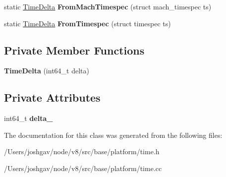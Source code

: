 \begin{DoxyCompactItemize}
\item 
static \hyperlink{classv8_1_1base_1_1_time_delta}{Time\+Delta} {\bfseries From\+Mach\+Timespec} (struct mach\+\_\+timespec ts)\hypertarget{classv8_1_1base_1_1_time_delta_acc527f0f013cfbb9c3e385ca412f70b6}{}\label{classv8_1_1base_1_1_time_delta_acc527f0f013cfbb9c3e385ca412f70b6}

\item 
static \hyperlink{classv8_1_1base_1_1_time_delta}{Time\+Delta} {\bfseries From\+Timespec} (struct timespec ts)\hypertarget{classv8_1_1base_1_1_time_delta_a8713573eefc14f286991f5ed33654571}{}\label{classv8_1_1base_1_1_time_delta_a8713573eefc14f286991f5ed33654571}

\end{DoxyCompactItemize}
\subsection*{Private Member Functions}
\begin{DoxyCompactItemize}
\item 
{\bfseries Time\+Delta} (int64\+\_\+t delta)\hypertarget{classv8_1_1base_1_1_time_delta_af42c4911e54d6b6c93a56d519b14a3ae}{}\label{classv8_1_1base_1_1_time_delta_af42c4911e54d6b6c93a56d519b14a3ae}

\end{DoxyCompactItemize}
\subsection*{Private Attributes}
\begin{DoxyCompactItemize}
\item 
int64\+\_\+t {\bfseries delta\+\_\+}\hypertarget{classv8_1_1base_1_1_time_delta_ac4d170b3d3873000f0d2ea0ecf74493b}{}\label{classv8_1_1base_1_1_time_delta_ac4d170b3d3873000f0d2ea0ecf74493b}

\end{DoxyCompactItemize}


The documentation for this class was generated from the following files\+:\begin{DoxyCompactItemize}
\item 
/\+Users/joshgav/node/v8/src/base/platform/time.\+h\item 
/\+Users/joshgav/node/v8/src/base/platform/time.\+cc\end{DoxyCompactItemize}
